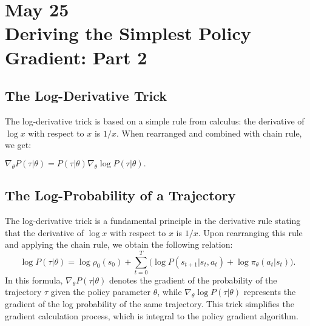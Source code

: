 \section{May 25\\ 
{\large Deriving the Simplest Policy Gradient: Part 2}}


\subsection{The Log-Derivative Trick}

The log-derivative trick is based on a simple rule from calculus: the derivative of $\log x$ with respect to $x$ is $1/x$. When rearranged and combined with chain rule, we get:

$\nabla_{\theta} P(\tau | \theta) = P(\tau | \theta) \nabla_{\theta} \log P(\tau | \theta).$

\subsection{The Log-Probability of a Trajectory}\label{log_prob}

The log-derivative trick is a fundamental principle in the derivative rule stating that the derivative of $\log x$ with respect to $x$ is $1/x$. Upon rearranging this rule and applying the chain rule, we obtain the following relation:
$$
\log P(\tau|\theta) = \log \rho_0 (s_0) + \sum_{t=0}^{T} \bigg( \log P(s_{t+1}|s_t, a_t)  + \log \pi_{\theta}(a_t |s_t)\bigg).$$
In this formula, $\nabla_{\theta} P(\tau | \theta)$ denotes the gradient of the probability of the trajectory $\tau$ given the policy parameter $\theta$, while $\nabla_{\theta} \log P(\tau | \theta)$ represents the gradient of the log probability of the same trajectory. This trick simplifies the gradient calculation process, which is integral to the policy gradient algorithm.
